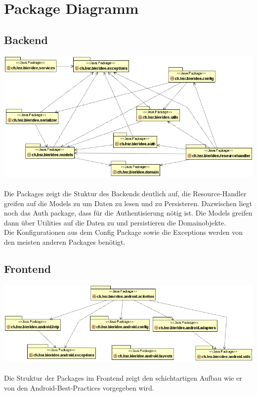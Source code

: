 \documentclass[10pt,a4paper]{scrartcl}
\begin{document}
\newpage

\section{Package Diagramm}
\subsection{Backend}
\includegraphics[width=\textwidth]{Package-Diagramm-Back.png}\\
\\
Die Packages zeigt die Stuktur des Backends deutlich auf, die Resource-Handler greifen  
auf die Models zu um Daten zu lesen und zu Persisteren. Dazwischen liegt noch das Auth package, dass für die Authentisierung nötig ist. Die Models greifen dann über Utilities
auf die Daten zu und persistieren die Domainobjekte.\\
Die Konfigurationen aus dem Config Package sowie die Exceptions werden von den meisten anderen
Packages benötigt.

\subsection{Frontend}
\includegraphics[width=\textwidth]{Package-Diagramm-Front.png}\\
\\
Die Struktur der Packages im Frontend zeigt den schichtartigen Aufbau wie er von den Android-Best-Practices vorgegeben wird.
\end{document}
